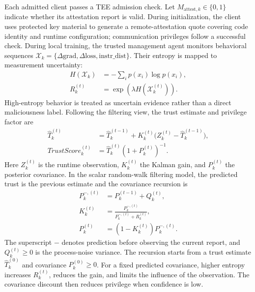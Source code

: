 \documentclass[conference,compsoc]{IEEEtran}
\begin{document}
Each admitted client passes a TEE admission check. Let $M_{\text{attest},k}\in\{0,1\}$ indicate whether its attestation report is valid. During initialization, the client uses protected key material to generate a remote-attestation quote covering code identity and runtime configuration; communication privileges follow a successful check. During local training, the trusted management agent monitors behavioral sequences $\mathcal{X}_k=\{\Delta\text{grad},\Delta\text{loss},\text{instr\_dist}\}$. Their entropy is mapped to measurement uncertainty:
\begin{equation}
    \begin{aligned}
        H(\mathcal{X}_k) & =-\sum_i p(x_i)\log p(x_i),                         \\
        R_k^{(t)}        & =\exp\!\left(\lambda H(\mathcal{X}_k^{(t)})\right).
    \end{aligned}
\end{equation}
High-entropy behavior is treated as uncertain evidence rather than a direct maliciousness label. Following the filtering view, the trust estimate and privilege factor are
\begin{equation}
    \begin{aligned}
        \hat T_k^{(t)}     & =\hat T_k^{(t-1)}+K_k^{(t)}\bigl(Z_k^{(t)}-\hat T_k^{(t-1)}\bigr), \\
        TrustScore_k^{(t)} & =\hat T_k^{(t)}(1+P_k^{(t)})^{-1}.
    \end{aligned}
\end{equation}
Here $Z_k^{(t)}$ is the runtime observation, $K_k^{(t)}$ the Kalman gain, and $P_k^{(t)}$ the posterior covariance. In the scalar random-walk filtering model, the predicted trust is the previous estimate and the covariance recursion is
\begin{equation}
    \begin{aligned}
        P_k^{-,(t)} &= P_k^{(t-1)}+Q_k^{(t)},\\
        K_k^{(t)} &= \frac{P_k^{-,(t)}}{P_k^{-,(t)}+R_k^{(t)}},\\
        P_k^{(t)} &= (1-K_k^{(t)})P_k^{-,(t)}.
    \end{aligned}
\end{equation}
The superscript $-$ denotes prediction before observing the current report, and $Q_k^{(t)}\geq0$ is the process-noise variance. The recursion starts from a trust estimate $\hat T_k^{(0)}$ and covariance $P_k^{(0)}\geq0$. For a fixed predicted covariance, higher entropy increases $R_k^{(t)}$, reduces the gain, and limits the influence of the observation. The covariance discount then reduces privilege when confidence is low.
\end{document}
